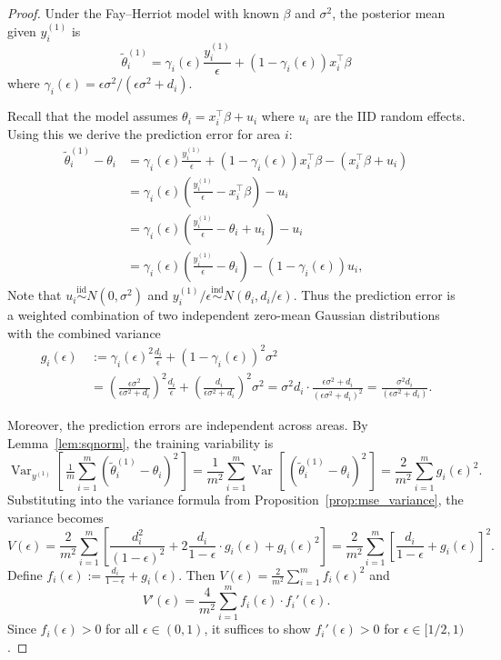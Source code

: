 \documentclass[11pt]{article}
\newcommand{\iid}{\stackrel{\text{iid}}{\sim}}
\newcommand{\ind}{\stackrel{\text{ind}}{\sim}}
\newcommand{\ytrain}{y^{(1)}}                           %
\newcommand{\Var}[2][]{\operatorname{Var}_{#1}\!\left[\,#2\,\right]}
\theoremstyle{plain}
\theoremstyle{definition}
\theoremstyle{remark}
\begin{document}
\begin{proof}
Under the Fay--Herriot model with known $\beta$ and $\sigma^2$, the posterior mean given $\ytrain_i$ is
\[
\tilde{\theta}_i^{(1)} = \gamma_i(\epsilon) \frac{y_i^{(1)}}{\epsilon} + (1-\gamma_i(\epsilon)) x_i^\top \beta
\]
where $\gamma_i(\epsilon) = \epsilon\sigma^2 / (\epsilon\sigma^2 + d_i)$.

Recall that the model assumes $\theta_i = x_i^\top\beta + u_i$ where $u_i$ are the IID random effects. Using this we derive the prediction error for area $i$:
\begin{align*}
\tilde{\theta}_i^{(1)} - \theta_i
&= \gamma_i(\epsilon) \frac{y_i^{(1)}}{\epsilon} + (1-\gamma_i(\epsilon)) x_i^\top\beta - (x_i^\top\beta + u_i) \\
&= \gamma_i(\epsilon) \left(\frac{y_i^{(1)}}{\epsilon} - x_i^\top \beta\right) - u_i \\
&= \gamma_i(\epsilon) \left(\frac{y_i^{(1)}}{\epsilon} - \theta_i + u_i \right) - u_i \\
&= \gamma_i(\epsilon) \left(\frac{y_i^{(1)}}{\epsilon} - \theta_i \right) -(1-\gamma_i(\epsilon)) u_i ,
\end{align*}
Note that $u_i \iid N(0, \sigma^2)$ and $y_i^{(1)}/\epsilon \ind N(\theta_i, d_i/\epsilon)$. Thus the prediction error is a weighted combination of two independent zero-mean Gaussian distributions with the combined variance
\begin{align*}
    g_i(\epsilon) \, &:=  \gamma_i(\epsilon)^2 \frac{d_i}{\epsilon}  + (1-\gamma_i(\epsilon))^2 \sigma^2 \\
    &= \left(\frac{\epsilon\sigma^2}{\epsilon\sigma^2 + d_i}\right)^2 \frac{d_i}{\epsilon} + \left(\frac{d_i}{\epsilon\sigma^2 + d_i}\right)^2 \sigma^2 = \sigma^2d_i \cdot \frac{\epsilon\sigma^2 + d_i}{(\epsilon\sigma^2 + d_i)^2} = \frac{\sigma^2 d_i}{(\epsilon\sigma^2 + d_i)}.
\end{align*}

Moreover, the prediction errors are independent across areas. By Lemma~\ref{lem:sqnorm}, the training variability is
\[
\Var[\ytrain]{\tfrac{1}{m}\sum_{i=1}^m (\tilde{\theta}_i^{(1)} - \theta_i)^2} = \frac{1}{m^2}\sum_{i=1}^m \Var{(\tilde{\theta}_i^{(1)} - \theta_i)^2} = \frac{2}{m^2}\sum_{i=1}^m g_i(\epsilon)^2.
\]
Substituting into the variance formula from Proposition~\ref{prop:mse_variance}, the variance becomes
\[
V(\epsilon) = \frac{2}{m^2}\sum_{i=1}^m \left[\frac{d_i^2}{(1-\epsilon)^2} + 2\frac{d_i}{1-\epsilon} \cdot g_i(\epsilon) + g_i(\epsilon)^2\right] = \frac{2}{m^2}\sum_{i=1}^m \left[\frac{d_i}{1-\epsilon} + g_i(\epsilon)\right]^2.
\]
Define $f_i(\epsilon) := \frac{d_i}{1-\epsilon} + g_i(\epsilon)$. Then $V(\epsilon) = \frac{2}{m^2}\sum_{i=1}^m f_i(\epsilon)^2$ and
\[
V'(\epsilon) = \frac{4}{m^2}\sum_{i=1}^m f_i(\epsilon) \cdot f_i'(\epsilon).
\]
Since $f_i(\epsilon) > 0$ for all $\epsilon \in (0,1)$, it suffices to show $f_i'(\epsilon) > 0$ for $\epsilon \in [1/2, 1)$.


\end{proof}
\end{document}
